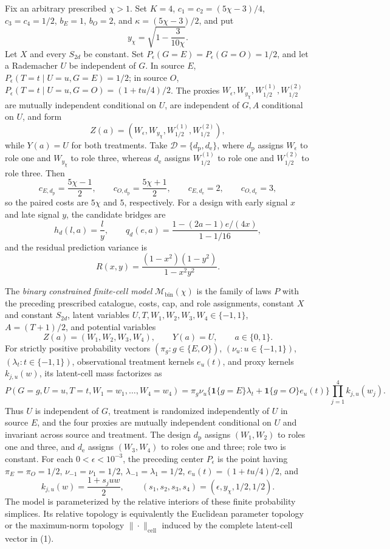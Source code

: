 Fix an arbitrary prescribed \(\chi>1\). Set \(K=4\), \(c_1=c_2=(5\chi-3)/4\), \(c_3=c_4=1/2\), \(b_E=1\), \(b_O=2\), and \(\kappa=(5\chi-3)/2\), and put
\[
 y_{\chi}=\sqrt{1-\frac{3}{10\chi}}.
\]
Let \(X\) and every \(S_{2d}\) be constant. Set \(P_{\epsilon}(G=E)=P_{\epsilon}(G=O)=1/2\), and let a Rademacher \(U\) be independent of \(G\). In source \(E\), \(P_{\epsilon}(T=t\mid U=u,G=E)=1/2\); in source \(O\), \(P_{\epsilon}(T=t\mid U=u,G=O)=(1+tu/4)/2\). The proxies \(W_{\epsilon},W_{y_{\chi}},W_{1/2}^{(1)},W_{1/2}^{(2)}\) are mutually independent conditional on \(U\), are independent of \(G,A\) conditional on \(U\), and form
\[
 Z(a)=(W_{\epsilon},W_{y_{\chi}},W_{1/2}^{(1)},W_{1/2}^{(2)}),
\]
while \(Y(a)=U\) for both treatments. Take \(\mathcal D=\{d_{\mathrm p},d_{\mathrm e}\}\), where \(d_{\mathrm p}\) assigns \(W_{\epsilon}\) to role one and \(W_{y_{\chi}}\) to role three, whereas \(d_{\mathrm e}\) assigns \(W_{1/2}^{(1)}\) to role one and \(W_{1/2}^{(2)}\) to role three. Then
\[
 c_{E,d_{\mathrm p}}=\frac{5\chi-1}{2},\qquad
 c_{O,d_{\mathrm p}}=\frac{5\chi+1}{2},\qquad
 c_{E,d_{\mathrm e}}=2,\qquad c_{O,d_{\mathrm e}}=3,
\]
so the paired costs are \(5\chi\) and \(5\), respectively. For a design with early signal \(x\) and late signal \(y\), the candidate bridges are
\[
 h_d(l,a)=\frac{l}{y},
 \qquad
 q_d(e,a)=\frac{1-(2a-1)e/(4x)}{1-1/16},
\]
and the residual prediction variance is
\[
 R(x,y)=\frac{(1-x^2)(1-y^2)}{1-x^2y^2}.
\]

The \emph{binary constrained finite-cell model} \(\mathcal M_{\mathrm{bin}}(\chi)\) is the family of laws \(P\) with the preceding prescribed catalogue, costs, cap, and role assignments, constant \(X\) and constant \(S_{2d}\), latent variables \(U,T,W_1,W_2,W_3,W_4\in\{-1,1\}\), \(A=(T+1)/2\), and potential variables
\[
 Z(a)=(W_1,W_2,W_3,W_4),\qquad Y(a)=U,
 \qquad a\in\{0,1\}.
\]
For strictly positive probability vectors \((\pi_g:g\in\{E,O\})\), \((\nu_u:u\in\{-1,1\})\), \((\lambda_t:t\in\{-1,1\})\), observational treatment kernels \(e_u(t)\), and proxy kernels \(k_{j,u}(w)\), its latent-cell mass factorizes as
\[
 P(G=g,U=u,T=t,W_1=w_1,\ldots,W_4=w_4)
 =\pi_g\nu_u\bigl\{\mathbf 1\{g=E\}\lambda_t
 +\mathbf 1\{g=O\}e_u(t)\bigr\}
 \prod_{j=1}^4k_{j,u}(w_j). \tag{1}
\]
Thus \(U\) is independent of \(G\), treatment is randomized independently of \(U\) in source \(E\), and the four proxies are mutually independent conditional on \(U\) and invariant across source and treatment. The design \(d_{\mathrm p}\) assigns \((W_1,W_2)\) to roles one and three, and \(d_{\mathrm e}\) assigns \((W_3,W_4)\) to roles one and three; role two is constant. For each \(0<\epsilon<10^{-3}\), the preceding center \(P_\epsilon\) is the point having \(\pi_E=\pi_O=1/2\), \(\nu_{-1}=\nu_1=1/2\), \(\lambda_{-1}=\lambda_1=1/2\), \(e_u(t)=(1+tu/4)/2\), and
\[
 k_{j,u}(w)=\frac{1+s_juw}{2},
 \qquad
 (s_1,s_2,s_3,s_4)=(\epsilon,y_{\chi},1/2,1/2).
\]
The model is parameterized by the relative interiors of these finite probability simplices. Its relative topology is equivalently the Euclidean parameter topology or the maximum-norm topology \(\|\cdot\|_{\mathrm{cell}}\) induced by the complete latent-cell vector in (1).